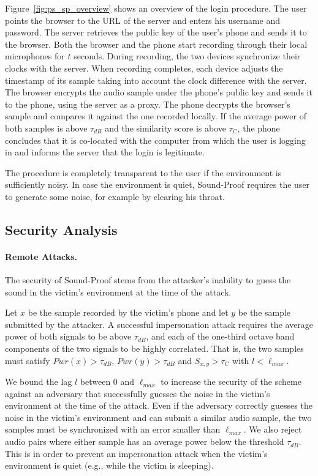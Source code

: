 Figure~\ref{fig:ps_sp_overview} shows an overview of the login procedure.
The user points the browser to the URL of the server and enters his username and password.
The server retrieves the public key of the user's phone and sends it to the browser.
Both the browser and the phone start recording through their local microphones for $t$ seconds.
During recording, the two devices synchronize their clocks with the server.
When recording completes, each device adjusts the timestamp of its sample taking into account the clock difference with the server.
The browser encrypts the audio sample under the phone's public key and sends it to the phone, using the server as a proxy.
The phone decrypts the browser's sample and compares it against the one recorded locally. %
If the average power of both samples is above $\tau_{dB}$ and the similarity score is above $\tau_C$,
the phone concludes that it is co-located with the computer from which the user is logging in and informs the server that the login is legitimate.

The procedure is completely transparent to the user if the environment is sufficiently noisy.
In case the environment is quiet, Sound-Proof requires the user to generate some noise, for example by clearing his throat.



\subsection{Security Analysis}
\label{sec:ps_sp_secanalysis}

\paragraph{Remote Attacks.} The security of Sound-Proof stems from the attacker's inability to guess the sound in the victim's environment at the time of the attack.

Let $x$ be the sample recorded by the victim's phone and let $y$ be the sample submitted by the attacker.
A successful impersonation attack requires  the average power of both signals to be above $\tau_{dB}$, and each of the one-third octave band components
of the two signals to be highly correlated.
That is, the two samples must satisfy $Pwr(x)>\tau_{dB}$, $Pwr(y)>\tau_{dB}$ and $S_{x,y}>\tau_C$ with $l<\ell_{max}$.

We bound the lag $l$ between $0$ and $\ell_{max}$ to increase the security of the scheme against an adversary that successfully guesses
the noise in the victim's environment at the time of the attack.
Even if the adversary correctly guesses the noise in the victim's environment and can submit a similar audio sample,
the two samples must be synchronized with an error smaller than $\ell_{max}$.
We also reject audio pairs where either sample has an average power below the threshold $\tau_{dB}$.
This is in order to prevent an impersonation attack when the victim's environment is quiet (e.g., while the victim is sleeping).

